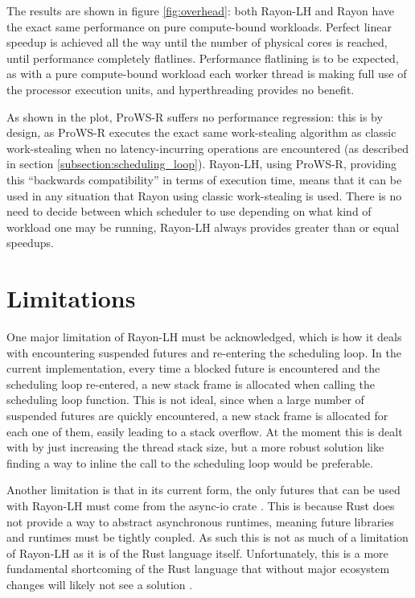 \documentclass[bsc,frontabs,singlespacing,parskip,deptreport,normalheadings]{infthesis}
\begin{document}
The results are shown in figure \ref{fig:overhead}: both Rayon-LH and Rayon have
the exact same performance on pure compute-bound workloads. Perfect linear
speedup is achieved all the way until the number of physical cores is reached,
until performance completely flatlines. Performance flatlining is to be
expected, as with a pure compute-bound workload each worker thread is making
full use of the processor execution units, and hyperthreading provides no
benefit.

As shown in the plot, ProWS-R suffers no performance regression: this is by
design, as ProWS-R executes the exact same work-stealing algorithm as classic
work-stealing when no latency-incurring operations are encountered (as described
in section \ref{subsection:scheduling_loop}). Rayon-LH, using ProWS-R, providing
this ``backwards compatibility'' in terms of execution time, means that it can be
used in any situation that Rayon using classic work-stealing is used. There is
no need to decide between which scheduler to use depending on what kind of
workload one may be running, Rayon-LH always provides greater than or equal
speedups.

\section{Limitations}
\label{section:limitations}

One major limitation of Rayon-LH must be acknowledged, which is how it deals
with encountering suspended futures and re-entering the scheduling loop. In the
current implementation, every time a blocked future is encountered and the
scheduling loop re-entered, a new stack frame is allocated when calling the
scheduling loop function. This is not ideal, since when a large number of
suspended futures are quickly encountered, a new stack frame is allocated for
each one of them, easily leading to a stack overflow. At the moment this is
dealt with by just increasing the thread stack size, but a more robust solution
like finding a way to inline the call to the scheduling loop would be
preferable.

Another limitation is that in its current form, the only futures that can be
used with Rayon-LH must come from the async-io crate
\cite{noauthor_async-io_2022}. This is because Rust does not provide a way to
abstract asynchronous runtimes, meaning future libraries and runtimes must be
tightly coupled. As such this is not as much of a limitation of Rayon-LH as it
is of the Rust language itself. Unfortunately, this is a more fundamental
shortcoming of the Rust language that without major ecosystem changes will
likely not see a solution \cite{-funswitch-loops_abstracting_2022}.
\end{document}
